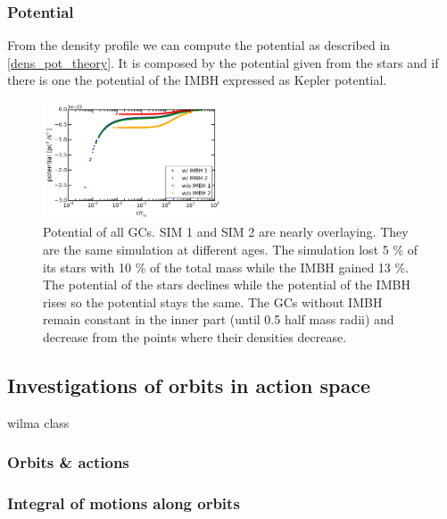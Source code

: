 \subsubsection{Potential}
From the density profile we can compute the potential as described in \ref{dens_pot_theory}. It is composed by the potential given from the stars and if there is one the potential of the \ac{IMBH} expressed as Kepler potential.
\begin{figure}
	\centering
	\includegraphics[width=0.475\textwidth]{Plots/potential.png}
	\caption{Potential of all \acp{GC}. SIM 1 and SIM 2 are nearly overlaying. They are the same simulation at different ages. The simulation lost 5 \% of its stars with 10 \% of the total mass while the \ac{IMBH} gained 13 \%. The potential of the stars declines while the potential of the \ac{IMBH} rises so the potential stays the same. The \acp{GC} without \ac{IMBH} remain constant in the inner part (until 0.5 half mass radii) and decrease from the points where their densities decrease.}
\end{figure}


\subsection{Investigations of orbits in action space}
wilma class 
\subsubsection{Orbits \& actions}


\subsubsection{Integral of motions along orbits}
